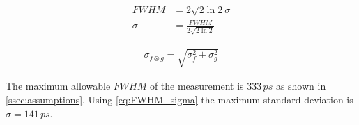 \begin{align}\label{eq:sigma_FWHM}
	FWHM   &= 2\sqrt{2\ln2}\sigma \\
	\sigma &= \frac{FWHM}{2\sqrt{2\ln2}}\label{eq:FWHM_sigma}
\end{align}

\begin{align}\label{eq:conv_sigma}
\sigma_{f\otimes g} = \sqrt{\sigma_f^2+\sigma_g^2}
\end{align}

The maximum allowable $FWHM$ of the measurement is $333\,ps$ as shown in \cref{ssec:assumptions}. Using \cref{eq:FWHM_sigma} the maximum standard deviation is $\sigma=141\,ps$.
















